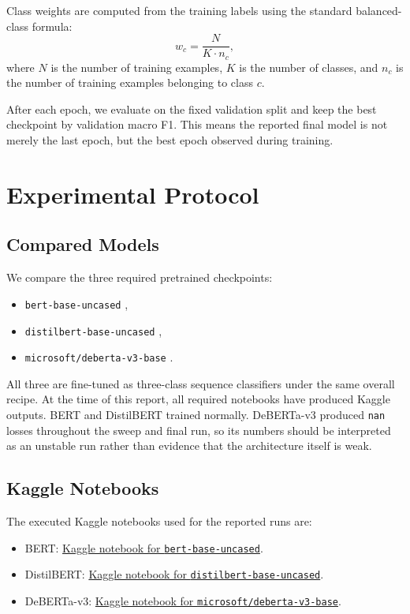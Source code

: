 Class weights are computed from the training labels using the standard balanced-class formula:
\[
w_c = \frac{N}{K \cdot n_c},
\]
where $N$ is the number of training examples, $K$ is the number of classes, and $n_c$ is the number of training examples belonging to class $c$.

After each epoch, we evaluate on the fixed validation split and keep the best checkpoint by validation macro F1. This means the reported final model is not merely the last epoch, but the best epoch observed during training.

\section{Experimental Protocol}

\subsection{Compared Models}

We compare the three required pretrained checkpoints:
\begin{itemize}
	\item \texttt{bert-base-uncased} \cite{bert},
	\item \texttt{distilbert-base-uncased} \cite{distilbert},
	\item \texttt{microsoft/deberta-v3-base} \cite{deberta}.
\end{itemize}

All three are fine-tuned as three-class sequence classifiers under the same overall recipe. At the time of this report, all required notebooks have produced Kaggle outputs. BERT and DistilBERT trained normally. DeBERTa-v3 produced \texttt{nan} losses throughout the sweep and final run, so its numbers should be interpreted as an unstable run rather than evidence that the architecture itself is weak.

\subsection{Kaggle Notebooks}

The executed Kaggle notebooks used for the reported runs are:
\begin{itemize}
	\item BERT: \href{https://www.kaggle.com/code/nikosskiadas/sdi2200160-bert-base-uncased}{Kaggle notebook for \texttt{bert-base-uncased}}.
	\item DistilBERT: \href{https://www.kaggle.com/code/nikosskiadas/sdi2200160-distilbert-base-uncased}{Kaggle notebook for \texttt{distilbert-base-uncased}}.
	\item DeBERTa-v3: \href{https://www.kaggle.com/code/nikosskiadas/sdi2200160-microsoft-deberta-v3-base}{Kaggle notebook for \texttt{microsoft/deberta-v3-base}}.
\end{itemize}

